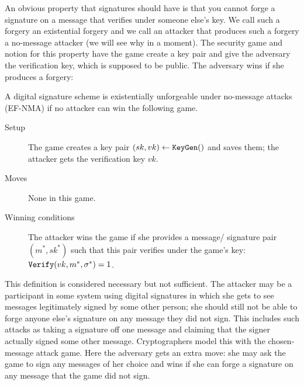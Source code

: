 \documentclass[envcountsame]{llncs}
\newcommand{\alg}[1]{\textup{\texttt{#1}}}
\begin{document}
An obvious property that signatures should have is that you cannot forge a
signature on a message that verifies under someone else's key. We call such a
forgery an existential forgery and we call an attacker that produces such a
forgery a no-message attacker (we will see why in a moment). The security game
and notion for this property have the game create a key pair and give the
adversary the verification key, which is supposed to be public. The adversary
wins if she produces a forgery:

\begin{definition}
A digital signature scheme is existentially unforgeable under no-message attacks
(EF-NMA) if no attacker can win the following game.

    \begin{description}
    \item[Setup] The game creates a key pair $(sk, vk) \gets \alg{KeyGen}()$ and
                 saves them; the attacker gets the verification key $vk$.

    \item[Moves] None in this game.

    \item[Winning conditions] The attacker wins the game if she provides a
    message/ signature pair $(m^*, sk^*)$ such that this pair verifies under the
    game's key: $\alg{Verify}(vk, m^*, \sigma^*) = 1$.
    \end{description}
\end{definition}

This definition is considered necessary but not sufficient. The attacker may be
a participant in some system using digital signatures in which she gets to see
messages legitimately signed by some other person; she should still not be able
to forge anyone else's signature on any message they did not sign. This includes
such attacks as taking a signature off one message and claiming that the signer
actually signed some other message. Cryptographers model this with the chosen-
message attack game. Here the adversary gets an extra move: she may ask the game
to sign any messages of her choice and wins if she can forge a signature on any
message that the game did not sign.
\end{document}
